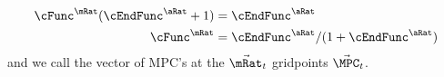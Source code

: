 \documentclass[\econtexRoot/BufferStockTheory]{subfiles}
\begin{document}
\begin{align*}
   \cFunc^{\mRat}(\cEndFunc^{\aRat}+1)  & = \cEndFunc^{\aRat}
\\ \cFunc^{\mRat}  & = \cEndFunc^{\aRat}/(1+\cEndFunc^{\aRat}) \label{eq:MPCfromMPTHC}
\end{align*}
and we call the vector of MPC's at the $\vec{\mRat}_{t}$ gridpoints $\vec{\MPC}_{t}$.
\begin{comment}

Standard polynomial interpolation methods can then be used to
construct a function that matches the level and first derivative at a
set of points; the actual solution code uses the built-in
interpolation tools of {\it Mathematica} for this purpose.

With the level and derivative of the consumption function defined at a discrete set of gridpoints,
it is possible to construct an interpolating function that is a highly accurate approximation to
the true consumption function within the grid.  But if any such interpolation is extended beyond the
boundaries defined by the minimum and maximum gridpoints, it is sure to go badly astray.


\end{comment}
\end{document}

